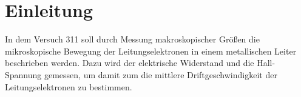 \section{Einleitung}
\label{sec:Einleitung}
In dem Versuch 311 soll durch Messung makroskopischer Größen
die mikroskopische Bewegung der Leitungselektronen in einem 
metallischen Leiter beschrieben werden. Dazu wird der elektrische
Widerstand und die Hall-Spannung gemessen, um damit zum die 
mittlere Driftgeschwindigkeit der Leitungselektronen zu bestimmen.